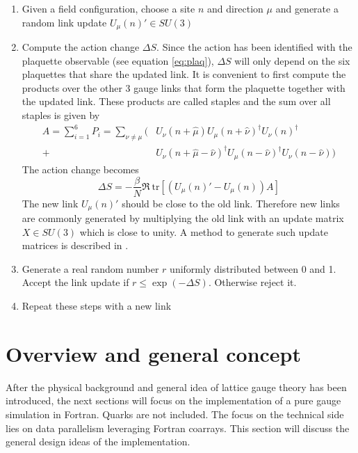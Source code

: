 \documentclass[graybox]{svmult}
\begin{document}
\begin{enumerate}
	\item Given a field configuration, choose a site $n$ and direction $\mu$ and generate a random link update $U_{\mu}(n)' \in SU(3)$
	\item Compute the action change $\Delta S$. Since the action has been identified with the plaquette observable (see equation \ref{eq:plaq}), $\Delta S$ will only depend on the six plaquettes that share the updated link. It is convenient to first compute the products over the other 3 gauge links that form the plaquette together with the updated link. These products are called staples and the sum over all staples is given by
	\begin{align}
		A = \sum_{i=1}^6 P_i = \sum_{\nu \neq \mu} \big( &U_{\nu}(n+\hat{\mu}) U_{\mu}(n+\hat{\nu})^{\dagger} U_{\nu}(n)^{\dagger}\\
		+ &U_{\nu}(n+\hat{\mu}-\hat{\nu})^{\dagger} U_{\mu}(n-\hat{\nu})^{\dagger} U_{\nu}(n-\hat{\nu}) \big)
	\end{align}
	The action change becomes
	\begin{equation}
		\Delta S = -\frac{\beta}{N} \Re\ \text{tr} [ (U_{\mu}(n)' - U_{\mu}(n)) A]
	\end{equation}
	The new link $U_{\mu}(n)'$ should be close to the old link. Therefore new links are commonly generated by multiplying the old link with an update matrix $X \in SU(3)$ which is close to unity. A method to generate such update matrices is described in \cite{gattringer}.
	\item Generate a real random number $r$ uniformly distributed between 0 and 1. Accept the link update if $r \leq \exp(-\Delta S)$. Otherwise reject it.
	\item Repeat these steps with a new link
\end{enumerate}




\section{Overview and general concept}

After the physical background and general idea of lattice gauge theory has been introduced, the next sections will focus on the implementation of a pure gauge simulation in Fortran. Quarks are not included. The focus on the technical side lies on data parallelism leveraging Fortran coarrays. This section will discuss the general design ideas of the implementation.
\end{document}
